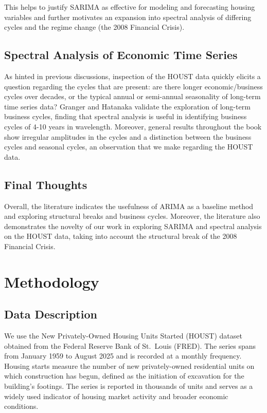 \documentclass[10pt,twocolumn,letterpaper]{article}
\begin{document}
This helps to justify SARIMA as effective for modeling and forecasting housing variables and further motivates an expansion into spectral analysis of differing cycles and the regime change (the 2008 Financial Crisis).

\subsection{Spectral Analysis of Economic Time Series}

As hinted in previous discussions, inspection of the HOUST data quickly elicits a question regarding the cycles that are present: are there longer economic/business cycles over decades, or the typical annual or semi-annual seasonality of long-term time series data? Granger and Hatanaka \cite{granger1964spectral} validate the exploration of long-term business cycles, finding that spectral analysis is useful in identifying business cycles of 4-10 years in wavelength. Moreover, general results throughout the book show irregular amplitudes in the cycles and a distinction between the business cycles and seasonal cycles, an observation that we make regarding the HOUST data.

\subsection{Final Thoughts}

Overall, the literature indicates the usefulness of ARIMA as a baseline method and exploring structural breaks and business cycles. Moreover, the literature also demonstrates the novelty of our work in exploring SARIMA and spectral analysis on the HOUST data, taking into account the structural break of the 2008 Financial Crisis.



\section{Methodology}
\label{sec:methodology}

\subsection{Data Description}

We use the New Privately-Owned Housing Units Started (HOUST) \cite{fred2025houst} dataset obtained from the Federal Reserve Bank of St.\ Louis (FRED). The series spans from January 1959 to August 2025 and is recorded at a monthly frequency. Housing starts measure the number of new privately-owned residential units on which construction has begun, defined as the initiation of excavation for the building’s footings. The series is reported in thousands of units and serves as a widely used indicator of housing market activity and broader economic conditions.
\end{document}
